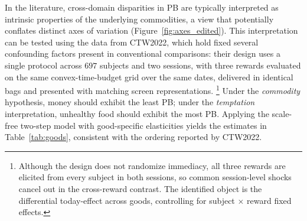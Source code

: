\documentclass[11pt,a4paper]{article}
\theoremstyle{plain}
\theoremstyle{definition}
\begin{document}



In the literature, cross-domain disparities in PB are typically interpreted as intrinsic properties of the underlying commodities, a view that potentially conflates distinct axes of variation (Figure~\ref{fig:axes_edited}). This interpretation can be tested using the data from CTW2022, which hold fixed several confounding factors present in conventional comparisons: their design uses a single protocol across $697$ subjects and two sessions, with three rewards evaluated on the same convex-time-budget grid over the same dates, delivered in identical bags and presented with matching screen representations.%
\footnote{%
Although the design does not randomize immediacy, all three rewards are elicited from every subject in both sessions, so common session-level shocks cancel out in the cross-reward contrast. The identified object is the differential today-effect across goods, controlling for subject $\times$ reward fixed effects.} 
Under the \textit{commodity} hypothesis, money should exhibit the least PB; under the \textit{temptation} interpretation, unhealthy food should exhibit the most PB. Applying the scale-free two-step model with good-specific elasticities yields the estimates in Table~\ref{tab:goods}, consistent with the ordering reported by CTW2022.
\end{document}
